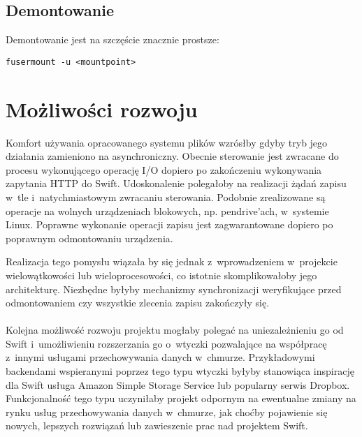 \subsection{Demontowanie}

Demontowanie jest na szczęście znacznie prostsze:

\begin{verbatim}
fusermount -u <mountpoint>
\end{verbatim}

\section{Możliwości rozwoju}

Komfort używania opracowanego systemu plików wzrósłby gdyby tryb jego działania
zamieniono na asynchroniczny. Obecnie sterowanie jest zwracane do procesu
wykonującego operację I/O dopiero po zakończeniu wykonywania zapytania HTTP do
Swift. Udoskonalenie polegałoby na realizacji żądań zapisu w~tle
i~natychmiastowym zwracaniu sterowania. Podobnie zrealizowane są operacje na
wolnych urządzeniach blokowych, np. pendrive'ach, w~systemie Linux. Poprawne
wykonanie operacji zapisu jest zagwarantowane dopiero po poprawnym odmontowaniu
urządzenia.

Realizacja tego pomysłu wiązała by się jednak z~wprowadzeniem w~projekcie
wielowątkowości lub wieloprocesowości, co istotnie skomplikowałoby jego
architekturę. Niezbędne byłyby mechanizmy synchronizacji weryfikujące przed
odmontowaniem czy wszystkie zlecenia zapisu zakończyły się.

\paragraph{}

Kolejna możliwość rozwoju projektu mogłaby polegać na uniezależnieniu go od
Swift i~umożliwieniu rozszerzania go o~wtyczki pozwalające na współpracę
z~innymi usługami przechowywania danych w~chmurze. Przykładowymi backendami
wspieranymi poprzez tego typu wtyczki byłyby stanowiąca inspirację dla Swift
usługa Amazon Simple Storage Service lub popularny serwis Dropbox.
Funkcjonalność tego typu uczyniłaby projekt odpornym na ewentualne zmiany na
rynku usług przechowywania danych w~chmurze, jak choćby pojawienie się nowych,
lepszych rozwiązań lub zawieszenie prac nad projektem Swift.

\paragraph{}

